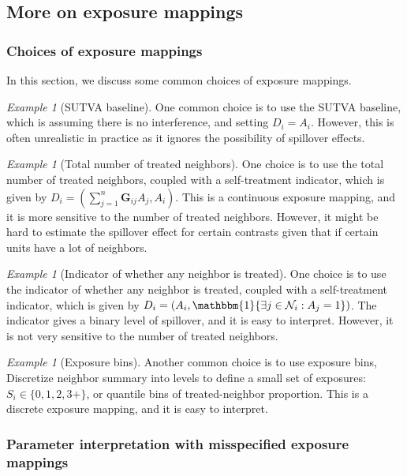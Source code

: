 \documentclass{article}
\theoremstyle{plain}
\theoremstyle{definition}
\theoremstyle{remark}
\newtheorem{example}[theorem]{Example}
\newcommand{\bG}{\boldsymbol{G}}
\newcommand{\cN}{\mathcal{N}}
\newcommand{\indicator}{\mathbbm{1}}
\newcommand{\sumj}{\sum_{j=1}^n}
\begin{document}
\subsection{More on exposure mappings}\label{sec:exposure_mapping}

\subsubsection{Choices of exposure mappings}

In this section, we discuss some common choices of exposure mappings. 
\begin{example}[SUTVA baseline]
    One common choice is to use the SUTVA baseline, which is assuming there is no interference, and setting $D_i = A_i$. However, this is often unrealistic in practice as it ignores the possibility of spillover effects.
\end{example}

\begin{example}[Total number of treated neighbors]
    One choice is to use the total number of treated neighbors, coupled with a self-treatment indicator, which is given by $D_i = (\sumj \bG_{ij}A_j, A_i)$. This is a continuous exposure mapping, and it is more sensitive to the number of treated neighbors. However, it might be hard to estimate the spillover effect for certain contrasts given that if certain units have a lot of neighbors. 
\end{example}

\begin{example}[Indicator of whether any neighbor is treated]
    One choice is to use the indicator of whether any neighbor is treated, coupled with a self-treatment indicator, which is given by $D_i = (A_i, \indicator{\exists j \in \cN_i : A_j = 1})$. The indicator gives a binary level of spillover, and it is easy to interpret. However, it is not very sensitive to the number of treated neighbors.
\end{example}

\begin{example}[Exposure bins]
    Another common choice is to use exposure bins, Discretize neighbor summary into levels to define a small set of exposures: $S_i \in \{0,1,2,3+\}$, or quantile bins of treated-neighbor proportion. This is a discrete exposure mapping, and it is easy to interpret. 
\end{example}

\subsubsection{Parameter interpretation with misspecified exposure mappings}
\end{document}
